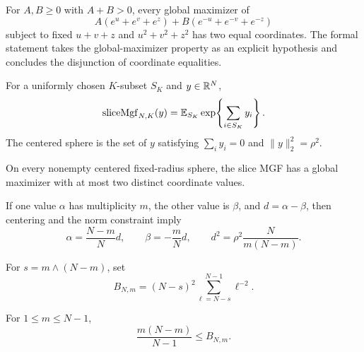 \begin{lemma}
\label{lem:three-coordinate}
\leanok
{}
For $A,B\ge0$ with $A+B>0$, every global maximizer of
\[
  A(e^u+e^v+e^z)+B(e^{-u}+e^{-v}+e^{-z})
\]
subject to fixed $u+v+z$ and $u^2+v^2+z^2$ has two equal coordinates.
The formal statement takes the global-maximizer property as an explicit
hypothesis and concludes the disjunction of coordinate equalities.
\end{lemma}

\begin{definition}
\label{def:slice}
\leanok
For a uniformly chosen $K$-subset $S_K$ and $y\in\mathbb{R}^N$,
\[
  \operatorname{sliceMgf}_{N,K}(y)
  =\mathbb{E}_{S_K}\exp\!\left\{\sum_{i\in S_K}y_i\right\}.
\]
The centered sphere is the set of $y$ satisfying
$\sum_i y_i=0$ and $\|y\|_2^2=\rho^2$.
\end{definition}

\begin{proposition}
\label{prop:two-level}
\leanok
{}
On every nonempty centered fixed-radius sphere, the slice MGF has a global
maximizer with at most two distinct coordinate values.

If one value $\alpha$ has multiplicity $m$, the other value is $\beta$, and
$d=\alpha-\beta$, then centering and the norm constraint imply
\[
  \alpha=\frac{N-m}{N}d,
  \qquad
  \beta=-\frac{m}{N}d,
  \qquad
  d^2=\rho^2\frac{N}{m(N-m)}.
  \tag{2}
\]
\end{proposition}

\begin{definition}
\label{def:martingale-factor}
\leanok
For $s=m\wedge(N-m)$, set
\[
  B_{N,m}=(N-s)^2\sum_{\ell=N-s}^{N-1}\ell^{-2}.
\]
\end{definition}

\begin{lemma}
\label{lem:hypergeom-factor}
\leanok
{}
For $1\le m\le N-1$,
\[
  \frac{m(N-m)}{N-1}\le B_{N,m}.
\]
\end{lemma}

